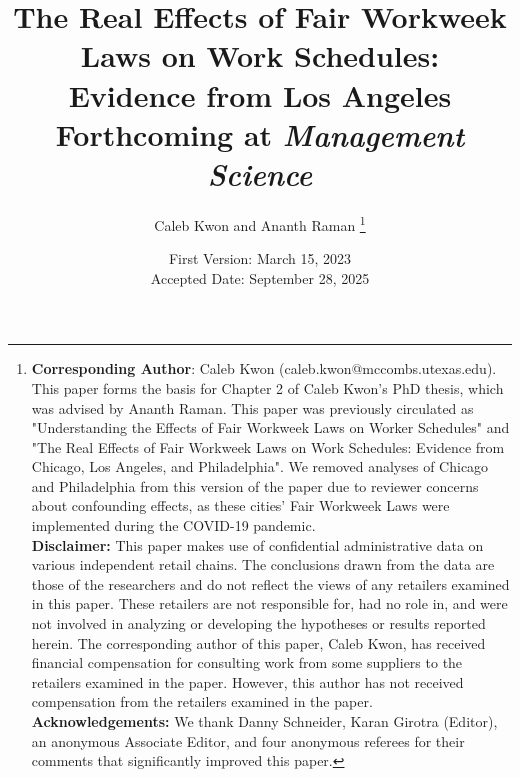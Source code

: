 \documentclass[letterpaper,11pt,leqno]{article}
\theoremstyle{paper}
\begin{document}
\title{\Large The Real Effects of Fair Workweek Laws on Work Schedules: \\ Evidence from Los Angeles \\[0.5em] \normalsize Forthcoming at \textit{Management Science}}
\author{Caleb Kwon and Ananth Raman
\thanks{
\textbf{Corresponding Author}: Caleb Kwon (caleb.kwon@mccombs.utexas.edu). This paper forms the basis for Chapter 2 of Caleb Kwon's PhD thesis, which was advised by Ananth Raman. This paper was previously circulated as "Understanding the Effects of Fair Workweek Laws on Worker Schedules" and "The Real Effects of Fair Workweek Laws on Work Schedules: Evidence from Chicago, Los Angeles, and Philadelphia". We removed analyses of Chicago and Philadelphia from this version of the paper due to reviewer concerns about confounding effects, as these cities' Fair Workweek Laws were implemented during the COVID-19 pandemic. \\ 
\textbf{Disclaimer:} This paper makes use of confidential administrative data on various independent retail chains. The conclusions drawn from the data are those of the researchers and do not reflect the views of any retailers examined in this paper. These retailers are not responsible for, had no role in, and were not involved in analyzing or developing the hypotheses or results reported herein.
The corresponding author of this paper, Caleb Kwon, has received financial compensation for consulting work from some suppliers to the retailers examined in the paper. However, this author has not received compensation from the retailers examined in the paper.\\
\textbf{Acknowledgements:} We thank Danny Schneider, Karan Girotra (Editor), an anonymous Associate Editor, and four anonymous referees for their comments that significantly improved this paper.  }}
\date{First Version: March 15, 2023\\
Accepted Date: September 28, 2025} 
\end{document}
